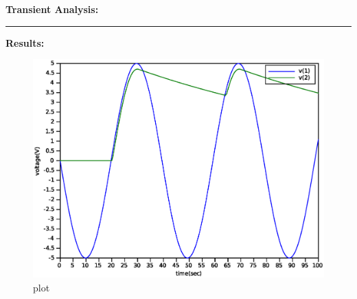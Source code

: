 \documentclass[a4paper,10pt]{report}
\begin{document}
{\bf Transient Analysis:} \\
\hrule\vspace{5mm}

{\bf Results:} \\
\begin{figure}[h]
\centering
\includegraphics[scale=0.5]{output.eps}
\caption{plot}
\end{figure}
\end{document}
